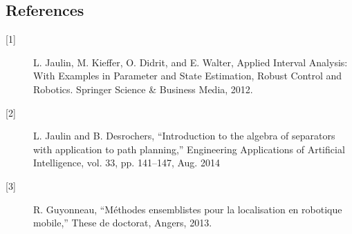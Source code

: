 \documentclass[14pt, a4paper]{article}
\begin{document}
	\subsection*{References}
		\begin{description}

			\item[{[1]}] L. Jaulin, M. Kieffer, O. Didrit, and E. Walter, Applied Interval Analysis: With Examples in Parameter and State Estimation, Robust Control and Robotics. Springer Science \& Business Media, 2012.
			
			\item[{[2]}] L. Jaulin and B. Desrochers, “Introduction to the algebra of separators with application to path planning,” Engineering Applications of Artificial Intelligence, vol. 33, pp. 141–147, Aug. 2014
			
			\item[{[3]}] R. Guyonneau, “Méthodes ensemblistes pour la localisation en robotique mobile,” These de doctorat, Angers, 2013.
				
	\end{description}
\end{document}
